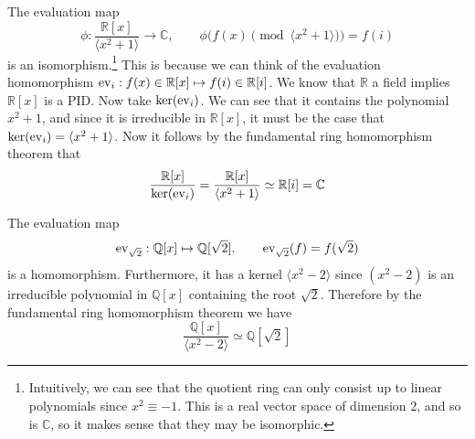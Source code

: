   \begin{example}
    The evaluation map 
    \begin{equation}
      \phi: \frac{\mathbb{R}[x]}{\langle x^2 + 1 \rangle} \rightarrow \mathbb{C}, \qquad \phi\big( f(x) \pmod{\langle x^2 + 1 \rangle} \big) = f(i)
    \end{equation}
    is an isomorphism.\footnote{Intuitively, we can see that the quotient ring can only consist up to linear polynomials since $x^2 \equiv -1$. This is a real vector space of dimension $2$, and so is $\mathbb{C}$, so it makes sense that they may be isomorphic. } This is because we can think of the evaluation homomorphism $\operatorname{ev}_i : f(x) \in \mathbb{R}[x] \mapsto f(i) \in \mathbb{R}[i]$. We know that $\mathbb{R}$ a field implies $\mathbb{R}[x]$ is a PID. Now take $\ker(\operatorname{ev}_i)$. We can see that it contains the polynomial $x^2 + 1$, and since it is irreducible in $\mathbb{R}[x]$, it must be the case that $\ker(\operatorname{ev}_i) = \langle x^2 + 1 \rangle$. Now it follows by the fundamental ring homomorphism theorem that 
    \begin{equation}
      \frac{\mathbb{R}[x]}{\ker(\operatorname{ev}_i)} = \frac{\mathbb{R}[x]}{\langle x^2 + 1 \rangle} \simeq \mathbb{R}[i] = \mathbb{C}
    \end{equation}
  \end{example} 

  \begin{example}
    The evaluation map 
    \begin{equation}
      \operatorname{ev}_{\sqrt{2}}: \mathbb{Q}[x] \mapsto \mathbb{Q}[\sqrt{2}], \qquad \operatorname{ev}_{\sqrt{2}} (f) = f(\sqrt{2}) 
    \end{equation}
    is a homomorphism. Furthermore, it has a kernel $\langle x^2 - 2 \rangle$ since $(x^2 - 2)$ is an irreducible polynomial in $\mathbb{Q}[x]$ containing the root $\sqrt{2}$. Therefore by the fundamental ring homomorphism theorem we have 
    \begin{equation}
      \frac{\mathbb{Q}[x]}{\langle x^2 - 2 \rangle} \simeq \mathbb{Q}[\sqrt{2}]
    \end{equation}
  \end{example} 

